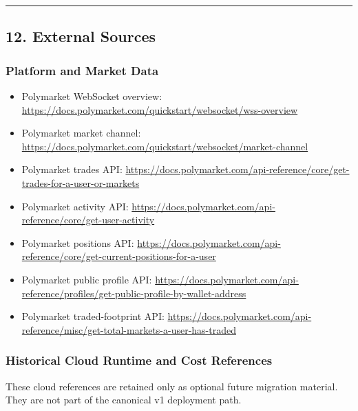 \documentclass[
]{article}
\providecommand{\tightlist}{%
  \setlength{\itemsep}{0pt}\setlength{\parskip}{0pt}}
\begin{document}
\begin{center}\rule{0.5\linewidth}{0.5pt}\end{center}

\subsection{12. External Sources}\label{12-external-sources}

\subsubsection{Platform and Market Data}\label{platform-and-market-data}

\begin{itemize}
\tightlist
\item
  Polymarket WebSocket overview:
  \url{https://docs.polymarket.com/quickstart/websocket/wss-overview}
\item
  Polymarket market channel:
  \url{https://docs.polymarket.com/quickstart/websocket/market-channel}
\item
  Polymarket trades API:
  \url{https://docs.polymarket.com/api-reference/core/get-trades-for-a-user-or-markets}
\item
  Polymarket activity API:
  \url{https://docs.polymarket.com/api-reference/core/get-user-activity}
\item
  Polymarket positions API:
  \url{https://docs.polymarket.com/api-reference/core/get-current-positions-for-a-user}
\item
  Polymarket public profile API:
  \url{https://docs.polymarket.com/api-reference/profiles/get-public-profile-by-wallet-address}
\item
  Polymarket traded-footprint API:
  \url{https://docs.polymarket.com/api-reference/misc/get-total-markets-a-user-has-traded}
\end{itemize}

\subsubsection{Historical Cloud Runtime and Cost
References}\label{gcp-runtime-and-cost-references}

These cloud references are retained only as optional future migration
material. They are not part of the canonical v1 deployment path.
\end{document}
